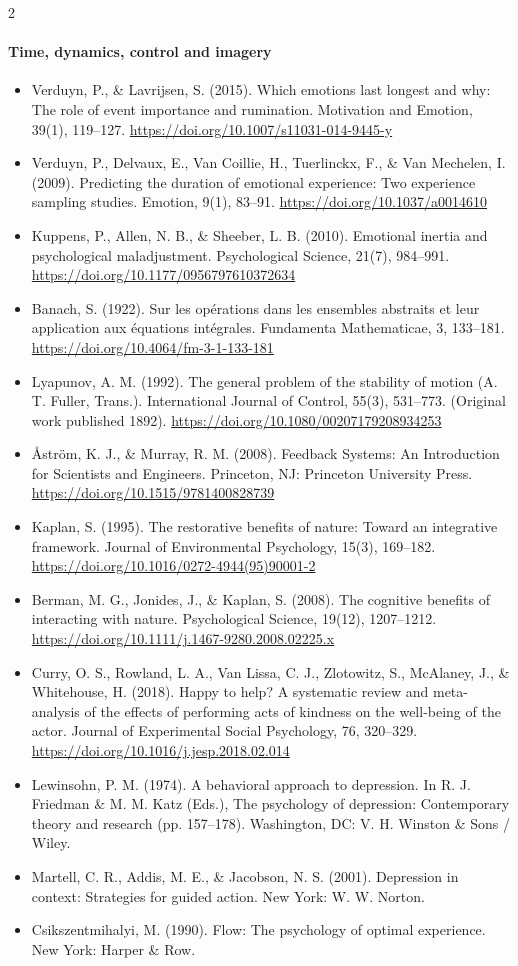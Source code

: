 \documentclass[10pt]{article}
\theoremstyle{definition}
\theoremstyle{remark}
\begin{document}
\begin{multicols}{2}
\paragraph{Time, dynamics, control and imagery}
\begin{itemize}[leftmargin=1em,itemsep=0pt,topsep=1pt,parsep=0pt]
\item Verduyn, P., \& Lavrijsen, S. (2015). Which emotions last longest and why: The role of event importance and rumination. Motivation and Emotion, 39(1), 119--127. \url{https://doi.org/10.1007/s11031-014-9445-y}
\item Verduyn, P., Delvaux, E., Van Coillie, H., Tuerlinckx, F., \& Van Mechelen, I. (2009). Predicting the duration of emotional experience: Two experience sampling studies. Emotion, 9(1), 83--91. \url{https://doi.org/10.1037/a0014610}
\item Kuppens, P., Allen, N. B., \& Sheeber, L. B. (2010). Emotional inertia and psychological maladjustment. Psychological Science, 21(7), 984--991. \url{https://doi.org/10.1177/0956797610372634}
\item Banach, S. (1922). Sur les opérations dans les ensembles abstraits et leur application aux équations intégrales. Fundamenta Mathematicae, 3, 133--181. \url{https://doi.org/10.4064/fm-3-1-133-181}
\item Lyapunov, A. M. (1992). The general problem of the stability of motion (A. T. Fuller, Trans.). International Journal of Control, 55(3), 531--773. (Original work published 1892). \url{https://doi.org/10.1080/00207179208934253}
\item Åström, K. J., \& Murray, R. M. (2008). Feedback Systems: An Introduction for Scientists and Engineers. Princeton, NJ: Princeton University Press. \url{https://doi.org/10.1515/9781400828739}
\item Kaplan, S. (1995). The restorative benefits of nature: Toward an integrative framework. Journal of Environmental Psychology, 15(3), 169--182. \url{https://doi.org/10.1016/0272-4944(95)90001-2}
\item Berman, M. G., Jonides, J., \& Kaplan, S. (2008). The cognitive benefits of interacting with nature. Psychological Science, 19(12), 1207--1212. \url{https://doi.org/10.1111/j.1467-9280.2008.02225.x}
\item Curry, O. S., Rowland, L. A., Van Lissa, C. J., Zlotowitz, S., McAlaney, J., \& Whitehouse, H. (2018). Happy to help? A systematic review and meta-analysis of the effects of performing acts of kindness on the well-being of the actor. Journal of Experimental Social Psychology, 76, 320--329. \url{https://doi.org/10.1016/j.jesp.2018.02.014}
\item Lewinsohn, P. M. (1974). A behavioral approach to depression. In R. J. Friedman \& M. M. Katz (Eds.), The psychology of depression: Contemporary theory and research (pp. 157--178). Washington, DC: V. H. Winston \& Sons / Wiley.
\item Martell, C. R., Addis, M. E., \& Jacobson, N. S. (2001). Depression in context: Strategies for guided action. New York: W. W. Norton.
\item Csikszentmihalyi, M. (1990). Flow: The psychology of optimal experience. New York: Harper \& Row.
\end{itemize}

\end{multicols}
\end{document}
